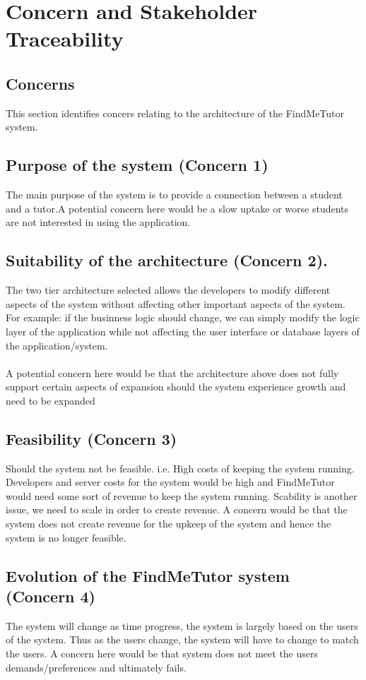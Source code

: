 \documentclass[12pt]{article}
\begin{document}
\pagebreak

\section{Concern and Stakeholder Traceability}
\subsection{Concerns}
This section identifies concers relating to the architecture of the FindMeTutor system.

\subsection{Purpose of the system (Concern 1)}
The main purpose of the system is to provide a connection between a student and a tutor.A potential concern here would be a slow uptake or worse students are not interested in using the application.

\subsection{Suitability of the architecture (Concern 2).}
The two tier architecture selected allows the developers to modify different aspects of the system without affecting other important aspects of the system. For example: if the businness logic should change, we can simply modify the logic layer of the application while not affecting the user interface or database layers of the application/system.\\\\A potential concern here would be that the architecture above does not fully support certain aspects of expansion should the system experience growth and need to be expanded

\subsection{Feasibility (Concern 3)}
Should the system not be feasible. i.e. High costs of keeping the system running. Developers and server costs for the system would be high and FindMeTutor would need some sort of revenue to keep the system running. Scability is another issue, we need to scale in order to create revenue. A concern would be that the system does not create revenue for the upkeep of the system and hence the system is no longer feasible.

\subsection{Evolution of the FindMeTutor system (Concern 4)}
The system will change as time progress, the system is largely based on the users of the system. Thus as the users change, the system will have to change to match the users. A concern here would be that system does not meet the users demands/preferences and ultimately fails.
\end{document}

